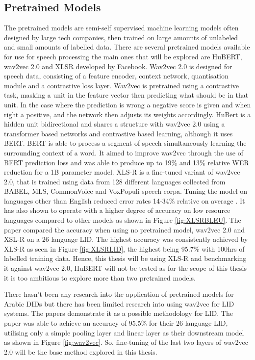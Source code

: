 \subsection{Pretrained Models}\label{sec:pretrain}
The pretrained models are semi-self supervised machine learning models often designed by large tech companies, then trained on large amounts of 
unlabeled and small amounts of labelled data. There are several pretrained models available for use for speech processing the main ones that will be explored are HuBERT, wav2vec 2.0 and XLSR developed by Facebook. 
Wav2vec 2.0 is designed for speech data, consisting of a feature encoder, context network, quantisation module and 
a contrastive loss layer. 
Wav2vec is pretrained using a contrastive task, masking a unit in the feature vector then predicting what 
should be in that unit. In the case where the prediction is wrong a negative score is given and when right a positive, and the network then adjusts its weights accordingly.  
HuBert is a hidden unit bidirectional and shares a structure with wav2vec 2.0 using a transformer based networks and contrastive based learning, although it uses BERT. 
BERT is able to process a segment of speech simultaneously learning the surrounding context of a word. It aimed to improve wav2vec through the use of BERT prediction loss and 
was able to produce up to 19\% and 13\% relative WER reduction for a 1B parameter model. XLS-R is a fine-tuned variant of wav2vec 2.0, that is trained using data from 128 different languages collected from  BABEL, MLS, CommonVoice and VoxPopuli speech corpa. 
Tuning the model on languages other than English reduced error rates 14-34\% relative on average \cite{babu_xls-r_2021}. It has also shown to operate 
with a higher degree of accuracy on low resource languages compared to other models as shown in Figure \ref{fig:XLSRBLEU}. 
The paper \cite{mohamed_arabic_2021} compared the accuracy when using no pretrained model, wav2vec 2.0 and XSL-R on a 26 language LID. The highest accuracy was consistently achieved by XLS-R as seen in 
Figure \ref{fig:XLSRLID}, the highest being 95.7\% with 100hrs of labelled training data. 
Hence, this thesis will be using XLS-R and benchmarking it against wav2vec 2.0, HuBERT will not be tested as 
for the scope of this thesis it is too ambitious to explore more than two pretrained models. 

There hasn't been any research into the application of pretrained models for Arabic DIDs but there has been limited research into using wav2vec for LID systems. 
The papers \cite{babu_xls-r_2021,mohamed_arabic_2021,tjandra_improved_2021} demonstrate it as a possible methodology for LID. The paper \cite{mohamed_arabic_2021} was able to achieve an accuracy of 95.5\% for their 26 language LID, utilising only 
a simple pooling layer and linear layer as their downstream model as shown in Figure \ref{fig:wav2vec}. So, fine-tuning of the last two layers of wav2vec 2.0 will be the base method explored in this thesis. 

